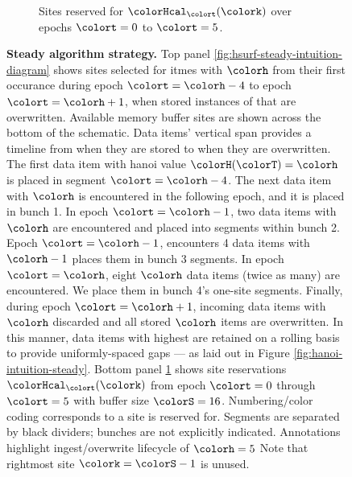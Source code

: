 \begin{figure}[htbp!]
\begin{subfigure}[b]{\linewidth}
\begin{tikzpicture}
    \end{tikzpicture}
    \vspace{-4.5ex}
    \caption{\footnotesize Sites reserved for \hv{} $\colorHcal_{\colort}(\colork)$ over epochs $\colort=0$ to $\colort=5$.}
    \label{fig:hsurf-steady-intuition-heatmap}
  \end{subfigure}%
  \caption{
    \textbf{Steady algorithm strategy.}
    \footnotesize
    Top panel \ref{fig:hsurf-steady-intuition-diagram} shows sites selected for itmes with \hv{} $\colorh$ from their first occurance during epoch $\colort=\colorh-4$ to epoch $\colort=\colorh+1$, when stored instances of that \hv{} are overwritten.
    Available memory buffer sites are shown across the bottom of the schematic.
    Data items' vertical span provides a timeline from when they are stored to when they are overwritten.
    The first data item with hanoi value $\colorH(\colorT) = \colorh$ is placed in segment $\colort=\colorh-4$.
    The next data item with \hv{} $\colorh$ is encountered in the following epoch, and it is placed in bunch 1.
    In epoch $\colort=\colorh-1$, two data items with \hv{} $\colorh$ are encountered and placed into segments within bunch 2.
    Epoch $\colort=\colorh-1$, encounters 4 data items with \hv{} $\colorh-1$ places them in bunch 3 segments.
    In epoch $\colort=\colorh$, eight \hv{} $\colorh$ data items (twice as many) are encountered.
    We place them in bunch 4's one-site segments.
    Finally, during epoch $\colort=\colorh+1$, incoming data items with \hv{} $\colorh$ discarded and all stored \hv{} $\colorh$ items are overwritten.
    In this manner, data items with highest \hv{} are retained on a rolling basis to provide uniformly-spaced gaps --- as laid out in Figure \ref{fig:hanoi-intuition-steady}.
    Bottom panel \ref{fig:hsurf-steady-intuition-heatmap} shows \hv{} site reservations $\colorHcal_{\colort}(\colork)$ from epoch $\colort=0$ through $\colort=5$ with buffer size $\colorS=16$.
    Numbering/color coding corresponds to \hv{} a site is reserved for.
    Segments are separated by black dividers; bunches are not explicitly indicated.
    Annotations highlight ingest/overwrite lifecycle of \hv{} $\colorh=5$
    Note that rightmost site $\colork=\colorS-1$ is unused.
  }
  \label{fig:hsurf-steady-intuition}
\end{figure}
